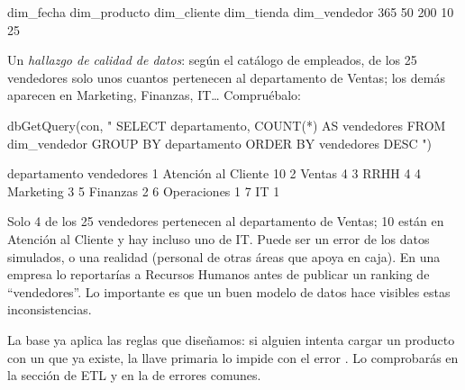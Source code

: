 
\begin{rsalida}
   dim_fecha dim_producto  dim_cliente   dim_tienda dim_vendedor 
         365           50          200           10           25 
\end{rsalida}

\begin{advertencia}
Un \emph{hallazgo de calidad de datos}: según el catálogo de empleados, de
los 25 vendedores solo unos cuantos pertenecen al departamento de Ventas;
los demás aparecen en Marketing, Finanzas, IT\ldots{} Compruébalo:
\end{advertencia}

\begin{rcode}
dbGetQuery(con, "
  SELECT departamento, COUNT(*) AS vendedores
  FROM dim_vendedor
  GROUP BY departamento
  ORDER BY vendedores DESC
")
\end{rcode}

\begin{rsalida}
         departamento vendedores
1 Atención al Cliente         10
2              Ventas          4
3                RRHH          4
4           Marketing          3
5            Finanzas          2
6         Operaciones          1
7                  IT          1
\end{rsalida}

Solo 4 de los 25 vendedores pertenecen al departamento de Ventas; 10 están
en Atención al Cliente y hay incluso uno de IT. Puede ser un error de los
datos simulados, o una realidad (personal de otras áreas que apoya en
caja). En una empresa lo reportarías a Recursos Humanos antes de publicar
un ranking de ``vendedores''. Lo importante es que un buen modelo de datos
hace visibles estas inconsistencias.

La base ya aplica las reglas que diseñamos: si alguien intenta cargar un
producto con un  que ya existe, la llave primaria lo
impide con el error . Lo comprobarás en la
sección de ETL y en la de errores comunes.

